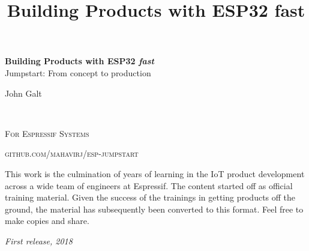 \documentclass[11pt,fleqn]{book} %
\begin{document}
\title{Building Products with ESP32 fast}


\begingroup
\thispagestyle{empty}
\centering
\vspace*{5cm}
\par\normalfont\fontsize{35}{35}\sffamily\selectfont
\textbf{Building Products with ESP32 \textit{fast}}\\
{\LARGE Jumpstart: From concept to production}\par %
\vspace*{1cm}
{\Huge John Galt}\par %
\endgroup


\newpage
~\vfill
\thispagestyle{empty}


\noindent \textsc{For Espressif Systems}

\noindent \textsc{github.com/mahavirj/esp-jumpstart} %

\noindent This work is the culmination of years of learning in the IoT product development across a wide team of engineers at Espressif. The content started off as official training material. Given the success of the trainings in getting products off the ground, the material has subsequently been converted to this format. Feel free to make copies and share. %

\noindent \textit{First release, 2018} %



\pagestyle{empty} %

\tableofcontents %
\end{document}
